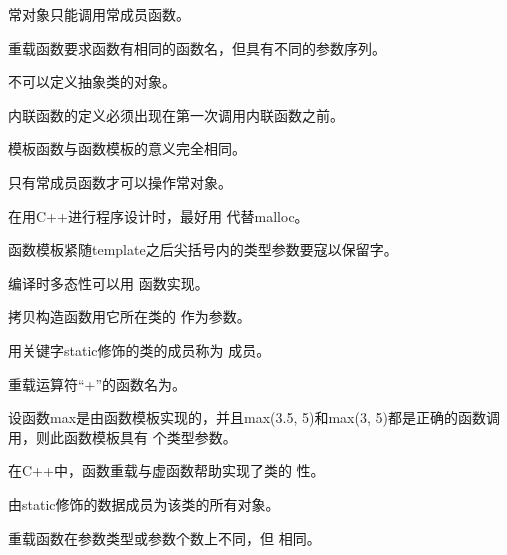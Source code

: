 \documentclass[sealed,answers,prescorebox]{nwsuafexam}%
\begin{document}
\begin{questions}
		\question
		常对象只能调用常成员函数。\selectbracket{\true}
		
		\question
		重载函数要求函数有相同的函数名，但具有不同的参数序列。\selectbracket{\true}
		
		\question
		不可以定义抽象类的对象。\selectbracket{\true}
		
		\question
		内联函数的定义必须出现在第一次调用内联函数之前。\selectbracket{\true}
		
		\question
		模板函数与函数模板的意义完全相同。\selectbracket{\flase}
		
		\question
    	只有常成员函数才可以操作常对象。\selectbracket{\true}
		
	    \question
	    在用C++进行程序设计时，最好用 代替malloc。
	    
	    \question
	    函数模板紧随template之后尖括号内的类型参数要寇以保留字。
	    
	    \question
	    编译时多态性可以用 函数实现。
	     
	    \question
	    拷贝构造函数用它所在类的 作为参数。
	    
	    \question
	    用关键字static修饰的类的成员称为 成员。
	    
	    \question
	    重载运算符“+”的函数名为。
	    
	    \question
	    设函数max是由函数模板实现的，并且max(3.5, 5)和max(3, 5)都是正确的函数调用，则此函数模板具有 个类型参数。
	    
	    \question
	    在C++中，函数重载与虚函数帮助实现了类的 性。
	    
	    \question
	    由static修饰的数据成员为该类的所有对象。
	    
	    \question
	    重载函数在参数类型或参数个数上不同，但 相同。
	    

\end{questions}
\end{document}
